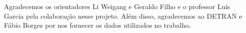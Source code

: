 Agradecemos os orientadores Li Weigang e Geraldo Filho e o professor Luís Garcia pela colaboração nesse projeto. Além disso, agradecemos ao DETRAN e Fábio Borges por nos fornecer os dados utilizados no trabalho.